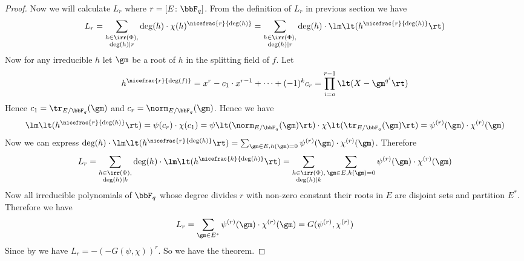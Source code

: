\begin{proof}
  Now we will calculate $L_r$  where $r=[E\colon \bbF_q]$. From the definition of $L_r$ in previous section we have $$L_r =  \sum_{\substack{h\in\irr(\Phi),\\ \deg(h)\mid r}}\deg(h)\cdot \chi(h)^{\nicefrac{r}{\deg(h)}}= \sum_{\substack{h\in\irr(\Phi),\\ \deg(h)\mid r}} \deg(h)\cdot \lm\lt( h^{\nicefrac{r}{\deg(h)}}\rt)$$Now for any irreducible $h$ let $\gm$ be a root of $h$ in the splitting field of $f$. Let $$h^{\nicefrac{r}{\deg(f)}}= x^r-c_1\cdot x^{r-1}+\cdots+(-1)^k c_r=\prod_{i=o}^{r-1}\lt(X-\gm^{q^i}\rt)$$Hence 
  $c_1=\tr_{E/\bbF_q}(\gm)$ and $c_r=\norm_{E/\bbF_q}(\gm)$. Hence we have $$\lm\lt(h^{\nicefrac{r}{\deg(h)}}\rt)=\psi(c_r)\cdot \chi(c_1)=\psi\lt(\norm_{E/\bbF_q}(\gm)\rt)\cdot \chi\lt(\tr_{E/\bbF_q}(\gm)\rt)=\psi^{(r)}(\gm)\cdot \chi^{(r)}(\gm)$$Now we can express $\deg(h)\cdot \lm\lt(h^{\nicefrac{r}{\deg(h)}}\rt)=\sum_{\gm\in E,h(\gm)=0}\psi^{(r)}(\gm)\cdot \chi^{(r)}(\gm)$. 
  Therefore $$L_r= \sum_{\substack{h\in\irr(\Phi),\\ \deg(h)\mid k}} \deg(h)\cdot \lm\lt( h^{\nicefrac{k}{\deg(h)}}\rt)=\sum_{\substack{h\in\irr(\Phi),\\ \deg(h)\mid k}}\sum_{\gm\in E,h(\gm)=0}\psi^{(r)}(\gm)\cdot \chi^{(r)}(\gm) $$Now all irreducible polynomials of $\bbF_q$ whose degree divides $r$ with non-zero constant their roots in $E$ are disjoint sets and partition $E^*$. Therefore we have $$L_r=\sum_{\gm\in E^*}\psi^{(r)}(\gm)\cdot \chi^{(r)}(\gm)=G(\psi^{(r)},\chi^{(r)})$$Since  by  we have $L_r=-(-G(\psi,\chi))^r$. So we have the theorem. 
\end{proof}

